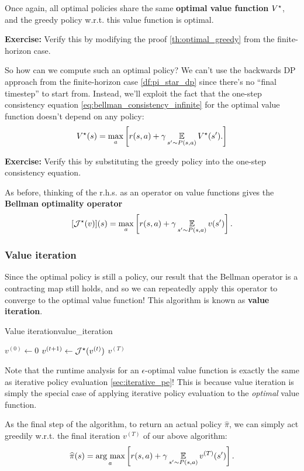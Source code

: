 \documentclass[\main/main]{subfiles}
\begin{document}
Once again, all optimal policies share the same \textbf{optimal value function} $V^\star$, and the greedy policy w.r.t. this value function is optimal.

\textbf{Exercise:} Verify this by modifying the proof \ref{th:optimal_greedy} from the finite-horizon case.

So how can we compute such an optimal policy? We can't use the backwards DP approach from the finite-horizon case \eqref{df:pi_star_dp} since there's no ``final timestep'' to start from. Instead, we'll exploit the fact that the one-step consistency equation \eqref{eq:bellman_consistency_infinite} for the optimal value function doesn't depend on any policy:
\[
    V^\star(s) = \max_a \left[ r(s, a) + \gamma \operatorname*{\mathbb{E}}_{s' \sim P(s, a)} V^\star(s'). \right]
\]

\textbf{Exercise:} Verify this by substituting the greedy policy into the one-step consistency equation.

As before, thinking of the r.h.s. as an operator on value functions gives the \textbf{Bellman optimality operator}
\[
    [\mathcal{J}^{\star}(v)](s) = \max_a \left[ r(s, a) + \gamma \operatorname*{\mathbb{E}}_{s' \sim P(s, a)} v(s') \right].
\]

\subsubsection{Value iteration}

Since the optimal policy is still a policy, our result that the Bellman operator is a contracting map still holds, and so we can repeatedly apply this operator to converge to the optimal value function! This algorithm is known as \textbf{value iteration}.

\begin{definition}{Value iteration}{value_iteration}
    \begin{algorithmic}
        \State $v^{(0)} \gets 0$
            \State $v^{(t+1)} \gets \mathcal{J}^{\star}(v^{(t)})$
        \EndFor
        \State \Return $v^{(T)}$
    \end{algorithmic}
\end{definition}

Note that the runtime analysis for an $\epsilon$-optimal value function is exactly the same as iterative policy evaluation \eqref{sec:iterative_pe}! This is because value iteration is simply the special case of applying iterative policy evaluation to the \emph{optimal} value function.

As the final step of the algorithm, to return an actual policy $\hat \pi$, we can simply act greedily w.r.t. the final iteration $v^{(T)}$ of our above algorithm:
\[
    \widehat \pi(s) = \operatorname*{\textrm{arg\ max}}_a \left[ r(s, a) + \gamma \operatorname*{\mathbb{E}}_{s' \sim P(s, a)} v^{(T)}(s') \right].
\]
\end{document}

